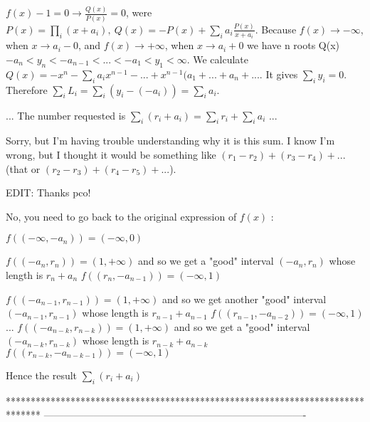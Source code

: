 \begin{mysolution}
	$f(x)-1=0\to \frac{Q(x)}{P(x)}=0$, were $P(x)=\prod_{i}(x+a_{i}), \ Q(x)=-P(x)+\sum_{i}a_{i}\frac{P(x)}{x+a_{i}}.$
Because $f(x)\to-\infty$, when $x\to a_{i}-0$, and $f(x)\to+\infty$, when $x\to a_{i}+0$ we have n roots Q(x)$-a_{n}<y_{n}<-a_{n-1}<...<-a_{1}<y_{1}<\infty$.
We calculate ${Q(x)=-x^{n}-\sum_{i}a_{i}x^{n-1}-...+x^{n-1}(a_{1}+...+a_{n}}+...$. It gives $\sum_{i}y_{i}=0$.
Therefore $\sum_{i}L_{i}=\sum_{i}(y_{i}-(-a_{i}))=\sum_{i}a_{i}.$
\end{mysolution}



\begin{mysolution}
	\begin{tcolorbox}

...
The number requested is $\sum_{i}(r_{i}+a_{i})= \sum_{i}r_{i}+\sum_{i}a_{i}$
...\end{tcolorbox}

Sorry, but I'm having trouble understanding why it is this sum. I know I'm wrong, but I thought it would be something like $(r_1 - r_2) + (r_3 - r_4) + ...$ (that or $(r_2-r_3) + (r_4-r_5) + ... $).

EDIT: Thanks pco!
\end{mysolution}



\begin{mysolution}

No, you need to go back to the original expression of $f(x)$ :

$f((-\infty,-a_n))=(-\infty,0)$

$f((-a_n,r_n))=(1,+\infty)$ and so we get a "good" interval $(-a_n,r_n)$ whose length is $r_n+a_n$
$f((r_n,-a_{n-1}))=(-\infty,1)$

$f((-a_{n-1},r_{n-1}))=(1,+\infty)$ and so we get another "good" interval $(-a_{n-1},r_{n-1})$ whose length is $r_{n-1}+a_{n-1}$
$f((r_{n-1},-a_{n-2}))=(-\infty,1)$
...
$f((-a_{n-k},r_{n-k}))=(1,+\infty)$ and so we get a "good" interval $(-a_{n-k},r_{n-k})$ whose length is $r_{n-k}+a_{n-k}$
$f((r_{n-k},-a_{n-k-1}))=(-\infty,1)$

Hence the result $\sum_{i}(r_{i}+a_{i})$
\end{mysolution}
*******************************************************************************
-------------------------------------------------------------------------------

